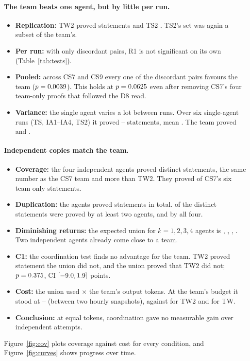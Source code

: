 \documentclass[11pt]{article}
\begin{document}
\paragraph{The team beats one agent, but by little per run.}
\begin{itemize}
  \item \textbf{Replication:} TW2 proved \CSnineTW{} statements and TS2 \CSnineTS. TS2's set was again a subset of the
    team's.
  \item \textbf{Per run:} with only \CSnineB{} discordant pairs, R1 is not significant on its own
    (Table~\ref{tab:tests}).
  \item \textbf{Pooled:} across CS7 and CS9 every one of the \PoolB{} discordant pairs favours the team ($p=0.0039$).
    This holds at $p=0.0625$ even after removing CS7's four team-only proofs that followed the D8 read.
  \item \textbf{Variance:} the single agent varies a lot between runs. Over six single-agent runs (TS, IA1--IA4, TS2)
    it proved \SingleMin--\SingleMax{} statements, mean \SingleMean. The team proved \CSsevenTW{} and \CSnineTW.
\end{itemize}

\paragraph{Independent copies match the team.}
\begin{itemize}
  \item \textbf{Coverage:} the four independent agents proved \CSeightUnion{} distinct statements, the same number as the
    CS7 team and more than TW2. They proved \CSeightTWonlyHit{} of CS7's six team-only statements.
  \item \textbf{Duplication:} the agents proved \CSeightSum{} statements in total. \CSeightDup{} of the \CSeightUnion{}
    distinct statements were proved by at least two agents, and \CSeightAllFour{} by all four.
  \item \textbf{Diminishing returns:} the expected union for $k=1,2,3,4$ agents is \CSeightKone, \CSeightKtwo,
    \CSeightKthree, \CSeightKfour. Two independent agents already come close to a team.
  \item \textbf{C1:} the coordination test finds no advantage for the team. TW2 proved \CoordB{} statement the union did
    not, and the union proved \CoordC{} that TW2 did not; $p=0.375$, CI $[-9.0, 1.9]$ points.
  \item \textbf{Cost:} the union used \CSeightOverTW$\times$ the team's output tokens. At the team's budget it stood at
    \CSeightTMlo--\CSeightTMhi{} (between two hourly snapshots), against \CSnineTW{} for TW2 and \CSsevenTW{} for TW.
  \item \textbf{Conclusion:} at equal tokens, coordination gave no measurable gain over independent attempts.
\end{itemize}
Figure~\ref{fig:cov} plots coverage against cost for every condition, and Figure~\ref{fig:curves} shows progress over
time.
\end{document}
